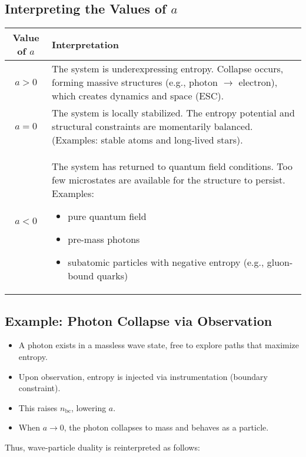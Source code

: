 \documentclass[12pt]{article}
\begin{document}
\subsection{Interpreting the Values of $a$}

\begin{center}
\begin{tabular}{|c|p{10cm}|}
\hline
\textbf{Value of $a$} & \textbf{Interpretation} \\
\hline
$a > 0$ & The system is underexpressing entropy. Collapse occurs, forming massive structures (e.g., photon $\rightarrow$ electron), which creates dynamics and space (ESC). \\
\hline
$a = 0$ & The system is locally stabilized. The entropy potential and structural constraints are momentarily balanced. (Examples: stable atoms and long-lived stars). \\
\hline
$a < 0$ & The system has returned to quantum field conditions. Too few microstates are available for the structure to persist. Examples:
\begin{itemize}
    \item pure quantum field
    \item pre-mass photons
    \item subatomic particles with negative entropy (e.g., gluon-bound quarks)
\end{itemize} \\
\hline
\end{tabular}
\end{center}

\subsection{Example: Photon Collapse via Observation}

\begin{itemize}
    \item A photon exists in a massless wave state, free to explore paths that maximize entropy.
    \item Upon observation, entropy is injected via instrumentation (boundary constraint).
    \item This raises $n_{\text{bc}}$, lowering $a$.
    \item When $a \to 0$, the photon collapses to mass and behaves as a particle.
\end{itemize}

\noindent
Thus, wave-particle duality is reinterpreted as follows:
\end{document}
